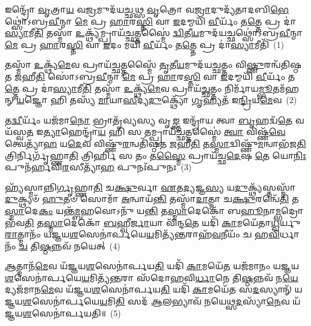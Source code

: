 \setcounter{anuvakam}{0}
𑌇𑌨𑍍𑌦𑍍𑌰𑍋᳴ \ul{𑌵𑍃}\-𑌤𑍍𑌰𑌾\-\ul{𑌯} 𑌵\-\ul{𑌜𑍍𑌰}\-𑌮𑍁𑌦᳴𑌯\-\ul{𑌚𑍍𑌛}\-𑌥𑍍𑌸 \ul{𑌵𑍃}\-𑌤𑍍𑌰𑍋 𑌵\-\ul{𑌜𑍍𑌰𑌾}\-𑌦𑍁𑌦𑍍𑌯᳴𑌤𑌾𑌦𑌬𑌿\-\ul{𑌭𑍇}\-𑌥𑍍𑌸𑍋॑\-𑌽𑌬𑍍𑌰\-\ul{𑌵𑍀}\-𑌨𑍍𑌮𑌾 \ul{𑌮𑍇} 𑌪𑍍𑌰 \ul{𑌹𑌾}\-𑌰\-\ul{𑌸𑍍𑌤𑌿} 𑌵𑌾 \ul{𑌇}\-𑌦𑌮𑍍𑌮𑌯𑌿᳴ \ul{𑌵𑍀}\-𑌰𑍍𑌯𑌂᳴ 𑌤\-\ul{𑌤𑍍𑌤𑍇} 𑌪𑍍𑌰 𑌦𑌾॑\-\ul{𑌸𑍍𑌯𑌾}\-𑌮𑍀\-\ul{𑌤𑌿} 𑌤𑌸𑍍𑌮𑌾᳴ \ul{𑌉}\-𑌕𑍍𑌥𑍍𑌯᳴𑌮𑍍𑌪𑍍𑌰𑌾𑌯᳴\-\ul{𑌚𑍍𑌛}\-𑌤𑍍𑌤𑌸𑍍𑌮𑍈॑ \ul{𑌦𑍍𑌵𑌿}\-𑌤𑍀\-\ul{𑌯}\-𑌮𑍁𑌦᳴𑌯\-\ul{𑌚𑍍𑌛}\-𑌥𑍍𑌸𑍋॑\-𑌽𑌬𑍍𑌰\-\ul{𑌵𑍀}\-𑌨𑍍𑌮𑌾 \ul{𑌮𑍇} 𑌪𑍍𑌰 \ul{𑌹𑌾}\-𑌰\-\ul{𑌸𑍍𑌤𑌿} 𑌵𑌾 \ul{𑌇}\-𑌦𑌂 𑌮𑌯𑌿᳴ \ul{𑌵𑍀}\-𑌰𑍍𑌯𑌂᳴ 𑌤\-\ul{𑌤𑍍𑌤𑍇} 𑌪𑍍𑌰 𑌦𑌾॑\-\ul{𑌸𑍍𑌯𑌾}\-𑌮𑍀𑌤𑌿᳴~(1)

𑌤𑌸𑍍𑌮𑌾᳴ \ul{𑌉}\-𑌕𑍍𑌥𑍍𑌯᳴\-\ul{𑌮𑍇}\-𑌵 𑌪𑍍𑌰𑌾𑌯᳴\-\ul{𑌚𑍍𑌛}\-𑌤𑍍𑌤𑌸𑍍𑌮𑍈᳴ \ul{𑌤𑍃}\-𑌤𑍀\-\ul{𑌯}\-𑌮𑍁𑌦᳴𑌯\-\ul{𑌚𑍍𑌛}\-𑌤𑍍𑌤𑌂 𑌵𑌿\-\ul{𑌷𑍍𑌣𑍁}\-𑌰𑌨𑍍𑌵᳴𑌤𑌿𑌷𑍍𑌠𑌤 \ul{𑌜}\-𑌹𑍀\-\ul{𑌤𑌿} 𑌸𑍋॑\-𑌽𑌬𑍍𑌰\-\ul{𑌵𑍀}\-𑌨𑍍𑌮𑌾 \ul{𑌮𑍇} 𑌪𑍍𑌰 \ul{𑌹𑌾}\-𑌰\-\ul{𑌸𑍍𑌤𑌿} 𑌵𑌾 \ul{𑌇}\-𑌦𑌮𑍍𑌮𑌯𑌿᳴ \ul{𑌵𑍀}\-𑌰𑍍𑌯𑌂᳴ 𑌤\-\ul{𑌤𑍍𑌤𑍇} 𑌪𑍍𑌰 𑌦𑌾॑\-\ul{𑌸𑍍𑌯𑌾}\-𑌮𑍀\-\ul{𑌤𑌿} 𑌤𑌸𑍍𑌮𑌾᳴ \ul{𑌉}\-𑌕𑍍𑌥𑍍𑌯᳴\-\ul{𑌮𑍇}\-𑌵 𑌪𑍍𑌰𑌾𑌯᳴\-\ul{𑌚𑍍𑌛}\-𑌤𑍍𑌤𑌂 𑌨𑌿𑌰𑍍𑌮𑌾᳴𑌯\-\ul{𑌮𑍍𑌭𑍂}\-𑌤𑌮᳴𑌹𑌨𑍍 \ul{𑌯}\-𑌜𑍍𑌞𑍋 𑌹𑌿 𑌤𑌸𑍍𑌯᳴ \ul{𑌮𑌾}\-𑌯𑌾\-\ul{𑌸𑍀}\-𑌦𑍍𑌯\-\ul{𑌦𑍁}\-𑌕𑍍𑌥𑍍𑌯𑍋᳴ \ul{𑌗𑍃}\-𑌹𑍍𑌯𑌤᳴ 𑌇\-\ul{𑌨𑍍𑌦𑍍𑌰𑌿}\-𑌯\-\ul{𑌮𑍇}\-𑌵~(2)

𑌤\-\ul{𑌦𑍍𑌵𑍀}\-𑌰𑍍𑌯𑌂᳴ 𑌯𑌜᳴𑌮𑌾\-\ul{𑌨𑍋} 𑌭𑍍𑌰𑌾𑌤𑍃᳴𑌵𑍍𑌯𑌸𑍍𑌯 𑌵𑍃\-\ul{𑌙𑍍𑌕𑍍𑌤} 𑌇𑌨𑍍𑌦𑍍𑌰𑌾᳴𑌯 𑌤𑍍𑌵𑌾 \ul{𑌬𑍃}\-𑌹𑌦𑍍𑌵᳴\-\ul{𑌤𑍇} 𑌵𑌯᳴𑌸𑍍𑌵\-\ul{𑌤} 𑌇\-\ul{𑌤𑍍𑌯𑌾}\-𑌹𑍇𑌨𑍍𑌦𑍍𑌰𑌾᳴\-\ul{𑌯} 𑌹𑌿 𑌸 𑌤𑌮𑍍𑌪𑍍𑌰𑌾𑌯᳴\-\ul{𑌚𑍍𑌛}\-𑌤𑍍𑌤𑌸𑍍𑌮𑍈॑ \ul{𑌤𑍍𑌵𑌾} 𑌵𑌿𑌷𑍍𑌣᳴\-\ul{𑌵𑍇} 𑌤𑍍𑌵𑍇𑌤𑍍𑌯𑌾᳴\-\ul{𑌹} 𑌯\-\ul{𑌦𑍇}\-𑌵 𑌵𑌿𑌷𑍍𑌣𑍁᳴\-\ul{𑌰}\-𑌨𑍍𑌵𑌤𑌿᳴𑌷𑍍𑌠𑌤 \ul{𑌜}\-𑌹𑍀\-\ul{𑌤𑌿} 𑌤\-\ul{𑌸𑍍𑌮𑌾}\-𑌦𑍍𑌵𑌿𑌷𑍍𑌣𑍁᳴\-\ul{𑌮}\-𑌨𑍍𑌵𑌾𑌭᳴𑌜\-\ul{𑌤𑌿} 𑌤𑍍𑌰𑌿𑌰𑍍𑌨𑌿𑌰𑍍𑌗𑍃᳴𑌹𑍍𑌣𑌾\-\ul{𑌤𑌿} 𑌤𑍍𑌰𑌿𑌰𑍍\mbox{}𑌹𑌿 𑌸 𑌤𑌂 𑌤\-\ul{𑌸𑍍𑌮𑍈} 𑌪𑍍𑌰𑌾𑌯᳴𑌚𑍍𑌛\-\ul{𑌦𑍇}\-𑌷 \ul{𑌤𑍇} 𑌯𑍋\-\ul{𑌨𑌿𑌃} 𑌪𑍁𑌨᳴𑌰𑍍\mbox{}𑌹𑌵𑌿\-\ul{𑌰}\-𑌸𑍀𑌤𑍍𑌯𑌾᳴\-\ul{𑌹} 𑌪𑍁𑌨𑌃᳴𑌪𑍁𑌨𑌃~(3)

𑌹𑍍𑌯᳴𑌸𑍍𑌮𑌾𑌨𑍍𑌨𑌿\-\ul{𑌰𑍍𑌗𑍃}\-𑌹𑍍𑌣𑌾\-\ul{𑌤𑌿} 𑌚\-\ul{𑌕𑍍𑌷𑍁}\-𑌰𑍍𑌵𑌾 \ul{𑌏}\-𑌤\-\ul{𑌦𑍍𑌯}\-𑌜𑍍𑌞\-\ul{𑌸𑍍𑌯} 𑌯\-\ul{𑌦𑍁}\-𑌕𑍍𑌥𑍍𑌯᳴𑌸𑍍𑌤𑌸𑍍𑌮𑌾᳴\-\ul{𑌦𑍁}\-𑌕𑍍𑌥𑍍𑌯𑍞᳴ \ul{𑌹𑍁}\-𑌤𑍞 𑌸𑍋𑌮𑌾᳴ \ul{𑌅}\-𑌨𑍍𑌵𑌾𑌯᳴\-\ul{𑌨𑍍𑌤𑌿} 𑌤𑌸𑍍𑌮𑌾᳴\-\ul{𑌦𑌾}\-𑌤𑍍𑌮𑌾 𑌚\-\ul{𑌕𑍍𑌷𑍁}\-𑌰𑌨𑍍𑌵𑍇᳴\-\ul{𑌤𑌿} 𑌤\-\ul{𑌸𑍍𑌮𑌾}\-𑌦𑍇\-\ul{𑌕𑌂} 𑌯𑌨𑍍𑌤᳴\-\ul{𑌮𑍍𑌬}\-𑌹𑌵𑍋\-𑌽𑌨𑍁᳴ 𑌯\-\ul{𑌨𑍍𑌤𑌿} 𑌤\-\ul{𑌸𑍍𑌮𑌾}\-𑌦𑍇𑌕𑍋᳴ 𑌬\-\ul{𑌹𑍂}\-𑌨𑌾\-\ul{𑌮𑍍𑌭}\-𑌦𑍍𑌰𑍋 𑌭᳴𑌵\-\ul{𑌤𑌿} 𑌤\-\ul{𑌸𑍍𑌮𑌾}\-𑌦𑍇𑌕𑍋᳴ \ul{𑌬}\-𑌹𑍍𑌵𑍀\-\ul{𑌰𑍍𑌜𑌾}\-𑌯𑌾 𑌵𑌿᳴𑌨𑍍𑌦\-\ul{𑌤𑍇} 𑌯𑌦𑌿᳴ \ul{𑌕𑌾}\-𑌮𑌯𑍇᳴𑌤𑌾\-\ul{𑌧𑍍𑌵}\-𑌰𑍍𑌯𑍁\-\ul{𑌰𑌾}\-𑌤𑍍𑌮𑌾𑌨𑌂᳴ 𑌯𑌜𑍍𑌞𑌯\-\ul{𑌶}\-𑌸𑍇𑌨𑌾॑𑌰𑍍𑌪𑌯𑍇\-\ul{𑌯}\-𑌮𑌿𑌤𑍍𑌯᳴\-\ul{𑌨𑍍𑌤}\-𑌰𑌾𑌹᳴\-\ul{𑌵}\-𑌨𑍀𑌯𑌂᳴ 𑌚 𑌹\-\ul{𑌵𑌿}\-𑌰𑍍𑌧𑌾𑌨𑌂᳴ \ul{𑌚} 𑌤𑌿\-\ul{𑌷𑍍𑌠}\-𑌨𑍍𑌨𑌵᳴ 𑌨𑌯𑍇𑌤𑍍~(4)

\-\ul{𑌆}\-𑌤𑍍𑌮𑌾𑌨᳴\-\ul{𑌮𑍇}\-𑌵 𑌯᳴𑌜𑍍𑌞𑌯\-\ul{𑌶}\-𑌸𑍇𑌨𑌾॑𑌰𑍍𑌪𑌯\-\ul{𑌤𑌿} 𑌯𑌦𑌿᳴ \ul{𑌕𑌾}\-𑌮𑌯𑍇᳴\-\ul{𑌤} 𑌯𑌜᳴𑌮𑌾𑌨𑌂 𑌯𑌜𑍍𑌞𑌯\-\ul{𑌶}\-𑌸𑍇𑌨𑌾॑𑌰𑍍𑌪𑌯𑍇\-\ul{𑌯}\-𑌮𑌿𑌤𑍍𑌯᳴\-\ul{𑌨𑍍𑌤}\-𑌰𑌾 𑌸᳴𑌦𑍋𑌹𑌵𑌿\-\ul{𑌰𑍍𑌧𑌾}\-𑌨𑍇 𑌤𑌿\-\ul{𑌷𑍍𑌠}\-𑌨𑍍𑌨𑌵᳴ 𑌨\-\ul{𑌯𑍇}\-𑌦𑍍𑌯𑌜᳴𑌮𑌾𑌨\-\ul{𑌮𑍇}\-𑌵 𑌯᳴𑌜𑍍𑌞𑌯\-\ul{𑌶}\-𑌸𑍇𑌨𑌾॑𑌰𑍍𑌪𑌯\-\ul{𑌤𑌿} 𑌯𑌦𑌿᳴ \ul{𑌕𑌾}\-𑌮𑌯𑍇᳴𑌤 𑌸\-\ul{𑌦}\-𑌸𑍍𑌯𑌾𑌨𑍍᳴ 𑌯𑌜𑍍𑌞𑌯\-\ul{𑌶}\-𑌸𑍇𑌨𑌾॑𑌰𑍍𑌪𑌯𑍇\-\ul{𑌯}\-𑌮𑌿\-\ul{𑌤𑌿} 𑌸𑌦᳴ \ul{𑌆}\-𑌲𑌭𑍍𑌯𑌾𑌵᳴ 𑌨𑌯𑍇𑌥𑍍𑌸\-\ul{𑌦}\-𑌸𑍍𑌯𑌾᳴\-\ul{𑌨𑍇}\-𑌵 𑌯᳴𑌜𑍍𑌞𑌯\-\ul{𑌶}\-𑌸𑍇𑌨𑌾॑𑌰𑍍𑌪𑌯𑌤𑌿॥~(5)

